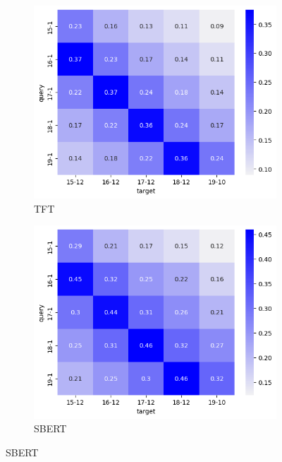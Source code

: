 \begin{figure}[ht]
    \begin{subfigure}{0.48\linewidth}
    \includegraphics[width=\linewidth]{stylometryExtensions/figures/heat/tft.png}
    \caption{TFT}
    \label{fig:tempral_vary:tft}
    \end{subfigure}
    \begin{subfigure}{0.48\linewidth}
    \includegraphics[width=\linewidth]{stylometryExtensions/figures/heat/sbert.png}
    \caption{SBERT}
    \label{fig:tempral_vary:sbert}
    \end{subfigure}


\end{figure}
